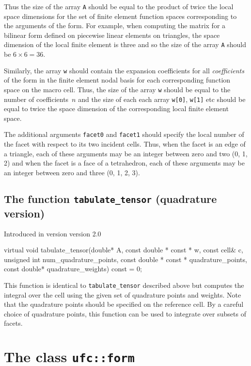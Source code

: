 Thus the size of the array \texttt{A} should be equal to the product
of twice the local space dimensions for the set of finite element
function spaces corresponding to the arguments of the form. For
example, when computing the matrix for a bilinear form defined on
piecewise linear elements on triangles, the space dimension of the
local finite element is three and so the size of the array \texttt{A}
should be $6 \times 6 = 36$.

Similarly, the array \texttt{w} should contain the expansion
coefficients for all \emph{coefficients} of the form in the finite
element nodal basis for each corresponding function space on the macro
cell. Thus, the size of the array \texttt{w} should be equal to the
number of coefficients~$n$ and the size of each each array
\texttt{w[0]}, \texttt{w[1]} etc should be equal to twice the space
dimension of the corresponding local finite element space.

The additional arguments \texttt{facet0} and \texttt{facet1} should
specify the local number of the facet with respect to its two incident
cells. Thus, when the facet is an edge of a triangle, each of these
arguments may be an integer between zero and two (0, 1, 2) and when
the facet is a face of a tetrahedron, each of these arguments may be
an integer between zero and three (0, 1, 2, 3).

\subsection{The function \texttt{tabulate\_tensor} (quadrature version)}
Introduced in version version 2.0

\begin{code}
virtual void
tabulate_tensor(double* A,
                const double * const * w,
                const cell& c,
                unsigned int num_quadrature_points,
                const double * const * quadrature_points,
                const double* quadrature_weights) const = 0;
\end{code}

This function is identical to \texttt{tabulate\_tensor} described
above but computes the integral over the cell using the given set of
quadrature points and weights. Note that the quadrature points should
be specified on the reference cell. By a careful choice of quadrature
points, this function can be used to integrate over subsets of facets.

\section{The class \texttt{ufc::form}}

